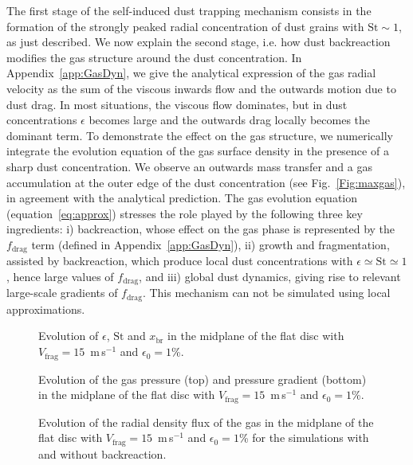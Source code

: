 \documentclass[a4paper,fleqn,usenatbib]{mnras}
\newcommand{\Vfrag}{V_\mathrm{frag}}  %
\newcommand{\St}{\mathrm{St}}         %
\begin{document}
The first stage of the self-induced dust trapping mechanism consists in the formation of the strongly peaked radial concentration of dust grains with $\St\sim1$, as just described. We now explain the second stage, i.e. how dust backreaction modifies the gas structure around the dust concentration. In Appendix~\ref{app:GasDyn}, we give the analytical expression of the gas radial velocity as the sum of the viscous inwards flow and the outwards motion due to dust drag. In most situations, the viscous flow dominates, but in dust concentrations $\epsilon$ becomes large and the outwards drag locally becomes the dominant term. To demonstrate the effect on the gas structure, we numerically integrate the evolution equation of the gas surface density in the presence of a sharp dust concentration. We observe an outwards mass transfer and a gas accumulation at the outer edge of the dust concentration (see Fig.~\ref{Fig:maxgas}), in agreement with the analytical prediction. The gas evolution equation (equation~\ref{eq:approx}) stresses the role played by the following three key ingredients: i) backreaction, whose effect on the gas phase is represented by the $f_\mathrm{drag}$ term (defined in Appendix~\ref{app:GasDyn}), ii) growth and fragmentation, assisted by backreaction, which produce local dust concentrations with $\epsilon \simeq \mathrm{St} \simeq 1$, hence large values of $f_\mathrm{drag}$, and iii) global dust dynamics, giving rise to relevant large-scale gradients of $f_\mathrm{drag}$. This mechanism can not be simulated using local approximations.

\begin{figure}
\centering
{}
\caption{Evolution of $\epsilon$, $\St$ and $x_\mathrm{br}$ in the midplane of the flat disc with $\Vfrag=15$~m\,s$^{-1}$ and $\epsilon_0=1$\%.}
\label{Fig:eps_Sr_x_br_flat_V15}
\end{figure}

\begin{figure}
\centering
{}
\caption{Evolution of the gas pressure (top) and pressure gradient (bottom) in the midplane of the flat disc with $\Vfrag=15$~m\,s$^{-1}$ and $\epsilon_0=1$\%.}
\label{Fig:Pmid_flat_V15}
\end{figure}

\begin{figure}
\centering
{}
\caption{Evolution of the radial density flux of the gas in the midplane of the flat disc with $\Vfrag=15$~m\,s$^{-1}$ and $\epsilon_0=1$\% for the simulations with and without backreaction.}
\label{Fig:gasflux_flat_V15}
\end{figure}
\end{document}
